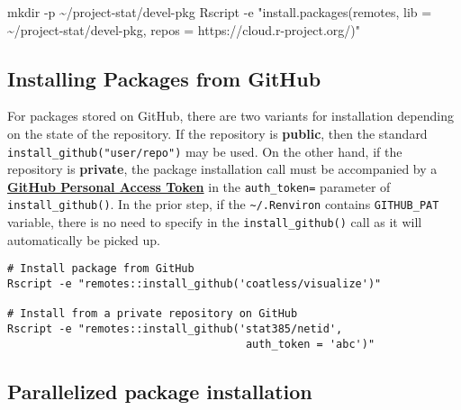 \documentclass[
  letterpaper,
  DIV=11,
  numbers=noendperiod]{scrreport}
\newenvironment{Shaded}{\begin{snugshade}}{\end{snugshade}}
\newcommand{\AttributeTok}[1]{\textcolor[rgb]{0.40,0.45,0.13}{#1}}
\newcommand{\ExtensionTok}[1]{\textcolor[rgb]{0.00,0.23,0.31}{#1}}
\newcommand{\FunctionTok}[1]{\textcolor[rgb]{0.28,0.35,0.67}{#1}}
\newcommand{\NormalTok}[1]{\textcolor[rgb]{0.00,0.23,0.31}{#1}}
\newcommand{\StringTok}[1]{\textcolor[rgb]{0.13,0.47,0.30}{#1}}
\begin{document}
\begin{Shaded}
\begin{Highlighting}[]
\FunctionTok{mkdir} \AttributeTok{{-}p}\NormalTok{ \textasciitilde{}/project{-}stat/devel{-}pkg}
\ExtensionTok{Rscript} \AttributeTok{{-}e} \StringTok{"install.packages(\textquotesingle{}remotes\textquotesingle{}, lib = \textquotesingle{}\textasciitilde{}/project{-}stat/devel{-}pkg\textquotesingle{},}
\StringTok{                             repos = \textquotesingle{}https://cloud.r{-}project.org/\textquotesingle{})"}
\end{Highlighting}
\end{Shaded}

\hypertarget{installing-packages-from-github}{%
\subsection{Installing Packages from
GitHub}\label{installing-packages-from-github}}

For packages stored on GitHub, there are two variants for installation
depending on the state of the repository. If the repository is
\textbf{public}, then the standard \texttt{install\_github("user/repo")}
may be used. On the other hand, if the repository is \textbf{private},
the package installation call must be accompanied by a
\href{https://help.github.com/articles/creating-an-access-token-for-command-line-use/}{\textbf{GitHub
Personal Access Token}} in the
\texttt{auth\_token=\textquotesingle{}\textquotesingle{}} parameter of
\texttt{install\_github()}. In the prior step, if the
\texttt{\textasciitilde{}/.Renviron} contains \texttt{GITHUB\_PAT}
variable, there is no need to specify in the \texttt{install\_github()}
call as it will automatically be picked up.

\begin{verbatim}
# Install package from GitHub
Rscript -e "remotes::install_github('coatless/visualize')"

# Install from a private repository on GitHub
Rscript -e "remotes::install_github('stat385/netid',
                                     auth_token = 'abc')"
\end{verbatim}

\hypertarget{parallelized-package-installation}{%
\subsection{Parallelized package
installation}\label{parallelized-package-installation}}
\end{document}
